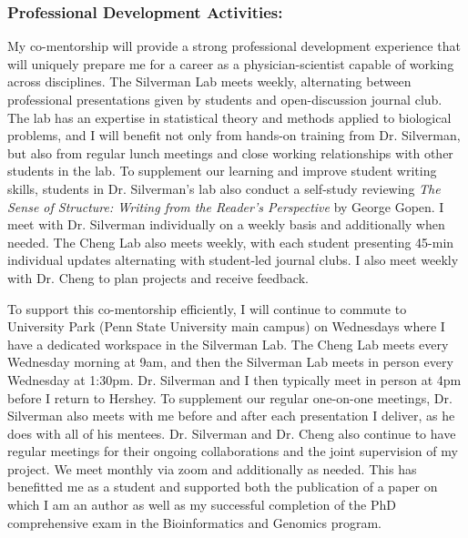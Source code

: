 \documentclass{NIHGrant}
\begin{document}
\subsubsection*{Professional Development Activities:}
My co-mentorship will provide a strong professional development experience that will uniquely prepare me for a career as a physician-scientist capable of working across disciplines. The Silverman Lab meets weekly, alternating between professional presentations given by students and open-discussion journal club. The lab has an expertise in statistical theory and methods applied to biological problems, and I will benefit not only from hands-on training from Dr. Silverman, but also from regular lunch meetings and close working relationships with other students in the lab. To supplement our learning and improve student writing skills, students in Dr. Silverman's lab also conduct a self-study reviewing \textit{The Sense of Structure: Writing from the Reader's Perspective} by George Gopen. I meet with Dr. Silverman individually on a weekly basis and additionally when needed. The Cheng Lab also meets weekly, with each student presenting 45-min individual updates alternating with student-led journal clubs. I also meet weekly with Dr. Cheng to plan projects and receive feedback.

To support this co-mentorship efficiently, I will continue to commute to University Park (Penn State University main campus) on Wednesdays where I have a dedicated workspace in the Silverman Lab. The Cheng Lab meets every Wednesday morning at 9am, and then the Silverman Lab meets in person every Wednesday at 1:30pm. Dr. Silverman and I then typically meet in person at 4pm before I return to Hershey. To supplement our regular one-on-one meetings, Dr. Silverman also meets with me before and after each presentation I deliver, as he does with all of his mentees. Dr. Silverman and Dr. Cheng also continue to have regular meetings for their ongoing collaborations and the joint supervision of my project. We meet monthly via zoom and additionally as needed. This has benefitted me as a student and supported both the publication of a paper on which I am an author as well as my successful completion of the PhD comprehensive exam in the Bioinformatics and Genomics program. %
\end{document}
